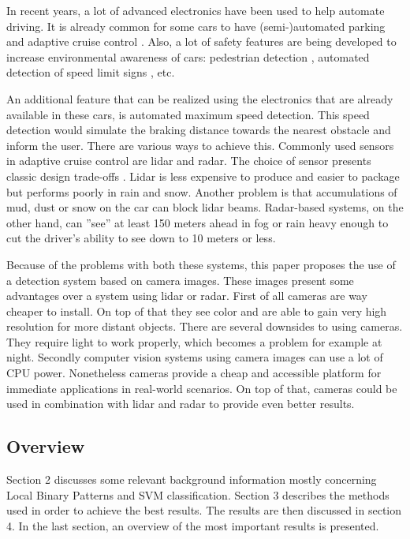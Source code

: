 \documentclass[runningheads,a4paper]{llncs}
\begin{document}
In recent years, a lot of advanced electronics have been used to help automate driving. It is already common for some cars to have (semi-)automated parking \cite{Pohl2006} and adaptive cruise control \cite{Jurgen}. Also, a lot of safety features are being developed to increase environmental awareness of cars: pedestrian detection \cite{Gavrila2000}, automated detection of speed limit signs \cite{Torresen2004}, etc. 

An additional feature that can be realized using the electronics that are already available in these cars, is automated maximum speed detection. This speed detection would simulate the braking distance towards the nearest obstacle and inform the user. There are various ways to achieve this. Commonly used sensors in adaptive cruise control are lidar and radar.  The choice of sensor presents classic design trade-offs \cite{Jones2001}.  Lidar  is  less  expensive  to  produce  and  easier  to package  but  performs  poorly  in  rain  and  snow. Another problem is that accumulations of mud, dust or snow on the car can block lidar beams. Radar-based  systems,  on  the  other  hand,  can ''see'' at least 150 meters ahead in fog or rain heavy enough to cut the driver's ability to see down to 10 meters or less. 

Because of the problems with both these systems, this paper proposes the use of a detection system based on camera images. These images present some advantages over a system using lidar or radar. First of all cameras are way cheaper to install. On top of that they see color and are able to gain very high resolution for more distant objects. There are several downsides to using cameras. They require light to work properly, which becomes a problem for example at night. Secondly computer vision systems using camera images can use a lot of CPU power. Nonetheless cameras provide a cheap and accessible platform for immediate applications in real-world scenarios. On top of that, cameras could be used in combination with lidar and radar to provide even better results. 

\subsection{Overview}
Section 2 discusses some relevant background information mostly concerning Local Binary Patterns and SVM classification. Section 3 describes the methods used in order to achieve the best results. The results are then discussed in section 4. In the last section, an overview of the most important results is presented.
\end{document}
